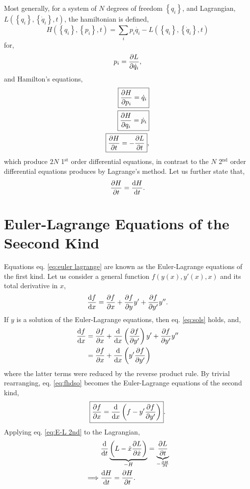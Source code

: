 \documentclass{book}
\begin{document}
Most generally, for a system of $N$ degrees of freedom $\left\{q_i\right\}$, and Lagrangian, $L(\left\{q_i\right\}, \left\{\Dot{q}_i\right\}, t)$, the hamiltonian is defined,
\begin{equation}
	\boxed{H(\left\{q_i\right\}, \left\{p_i\right\}, t) = \sum_ip_i\Dot{q_i} - L(\left\{q_i\right\}, \left\{\Dot{q}_i\right\}, t)}
\end{equation}
for,
\begin{equation}
	p_i = \pdv{L}{\Dot{q}_i},
\end{equation}
and Hamilton's equations,
\begin{align}
	\boxed{\pdv{H}{p_i} = \Dot{q}_i} \\
	\boxed{\pdv{H}{q_i} = \Dot{p}_i} \\
	\boxed{\pdv{H}{t} = - \pdv{L}{t}},
\end{align}
which produce $2N$ 1$^{\text{st}}$ order differential equations, in contrast to the $N$ 2$^{\text{nd}}$ order differential equations produces by Lagrange's method. Let us further state that,
\begin{equation}
	\pdv{H}{t} = \dv{H}{t}.
\end{equation}
\section{Euler-Lagrange Equations of the Seecond Kind}
Equations eq. \eqref{eq:euler lagrange} are known as the Euler-Lagrange equations of the first kind. Let us consider a general function $f(y(x), y'(x), x)$ and its total derivative in $x$,
\begin{equation}
	\dv{f}{x} = \pdv{f}{x} + \pdv{f}{y}y' + \pdv{f}{y'}y''.
\end{equation}
If $y$ is a solution of the Euler-Lagrange equations, then eq. \eqref{eq:sols} holds, and,
\begin{equation}
	\begin{split}
	\dv{f}{x} & = \pdv{f}{x} + \dv{x}\left(\pdv{f}{y'}\right)y' + \pdv{f}{y'}y'' \\
	& = \pdv{f}{x} + \dv{x}\left(y'\pdv{f}{y'}\right) \label{eq:fhdso}
	\end{split}
\end{equation}
where the latter terms were reduced by the reverse product rule. By trivial rearranging, eq. \eqref{eq:fhdso} becomes the Euler-Lagrange equations of the second kind,
\begin{equation}
	\boxed{\pdv{f}{x} = \dv{x}\left(f - y'\pdv{f}{y'}\right)}. \label{eq:E-L 2nd}
\end{equation}
Applying eq. \eqref{eq:E-L 2nd} to the Lagrangian,
\begin{equation}
	\begin{split}
	&\dv{t}\underbrace{\left(L - \Dot{x}\pdv{L}{\Dot{x}}\right)}_{-H} = \underbrace{\pdv{L}{t}}_{-\pdv{H}{t}} \\
	\implies & \dv{H}{t} = \pdv{H}{t}.
	\end{split}
\end{equation}
\end{document}
